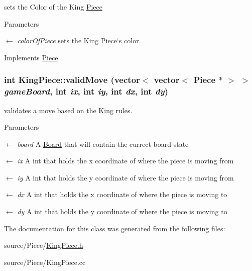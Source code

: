 sets the Color of the King \hyperlink{classPiece}{Piece} 
\begin{DoxyParams}{Parameters}
\item[\mbox{$\leftarrow$} {\em colorOfPiece}]sets the King Piece`s color \end{DoxyParams}


Implements \hyperlink{classPiece_a1387cb503dca308ac1e3bbe38a70a073}{Piece}.\hypertarget{classKingPiece_ae2ae8557d6d6e5fd1dcacdf7839de49f}{
\subsubsection[{validMove}]{\setlength{\rightskip}{0pt plus 5cm}int KingPiece::validMove (vector$<$ vector$<$ {\bf Piece} $\ast$ $>$ $>$ {\em gameBoard}, \/  int {\em ix}, \/  int {\em iy}, \/  int {\em dx}, \/  int {\em dy})}}
\label{classKingPiece_ae2ae8557d6d6e5fd1dcacdf7839de49f}


validates a move based on the King rules. 
\begin{DoxyParams}{Parameters}
\item[\mbox{$\leftarrow$} {\em board}]A \hyperlink{classBoard}{Board} that will contain the currect board state \item[\mbox{$\leftarrow$} {\em ix}]A int that holds the x coordinate of where the piece is moving from \item[\mbox{$\leftarrow$} {\em iy}]A int that holds the y coordinate of where the piece is moving from \item[\mbox{$\leftarrow$} {\em dx}]A int that holds the x coordinate of where the piece is moving to \item[\mbox{$\leftarrow$} {\em dy}]A int that holds the y coordinate of where the piece is moving to \end{DoxyParams}


The documentation for this class was generated from the following files:\begin{DoxyCompactItemize}
\item 
source/Piece/\hyperlink{KingPiece_8h}{KingPiece.h}\item 
source/Piece/KingPiece.cc\end{DoxyCompactItemize}
